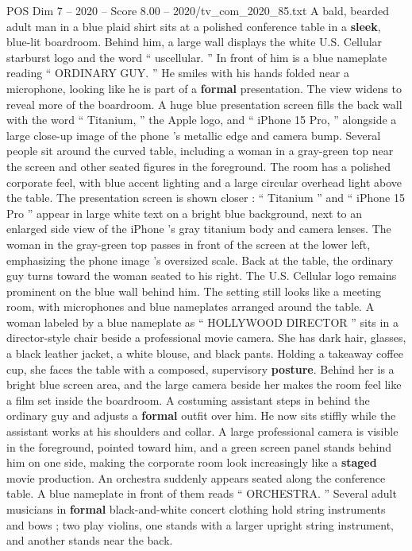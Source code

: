 \begin{textsample}{POS Dim 7 – 2020 – Score 8.00 – 2020/tv\_com\_2020\_85.txt}  \label{ex:f7_pos_083}
A bald, bearded adult man in a blue plaid shirt sits at a polished conference table in a \textbf{sleek}, blue-lit boardroom.
Behind him, a large wall displays the white U.S.
Cellular starburst logo and the word “ uscellular. ” In front of him is a blue nameplate reading “ ORDINARY GUY. ” He smiles with his hands folded near a microphone, looking like he is part of a \textbf{formal} presentation.
The view widens to reveal more of the boardroom.
A huge blue presentation screen fills the back wall with the word “ Titanium, ” the Apple logo, and “ iPhone 15 Pro, ” alongside a large close-up image of the phone ’s metallic edge and camera bump.
Several people sit around the curved table, including a woman in a gray-green top near the screen and other seated figures in the foreground.
The room has a polished corporate feel, with blue accent lighting and a large circular overhead light above the table.
The presentation screen is shown closer : “ Titanium ” and “ iPhone 15 Pro ” appear in large white text on a bright blue background, next to an enlarged side view of the iPhone ’s gray titanium body and camera lenses.
The woman in the gray-green top passes in front of the screen at the lower left, emphasizing the phone image ’s oversized scale.
Back at the table, the ordinary guy turns toward the woman seated to his right.
The U.S.
Cellular logo remains prominent on the blue wall behind him.
The setting still looks like a meeting room, with microphones and blue nameplates arranged around the table.
A woman labeled by a blue nameplate as “ HOLLYWOOD DIRECTOR ” sits in a director-style chair beside a professional movie camera.
She has dark hair, glasses, a black leather jacket, a white blouse, and black pants.
Holding a takeaway coffee cup, she faces the table with a composed, supervisory \textbf{posture}.
Behind her is a bright blue screen area, and the large camera beside her makes the room feel like a film set inside the boardroom.
A costuming assistant steps in behind the ordinary guy and adjusts a \textbf{formal} outfit over him.
He now sits stiffly while the assistant works at his shoulders and collar.
A large professional camera is visible in the foreground, pointed toward him, and a green screen panel stands behind him on one side, making the corporate room look increasingly like a \textbf{staged} movie production.
An orchestra suddenly appears seated along the conference table.
A blue nameplate in front of them reads “ ORCHESTRA. ” Several adult musicians in \textbf{formal} black-and-white concert clothing hold string instruments and bows ; two play violins, one stands with a larger upright string instrument, and another stands near the back.

\end{textsample}
